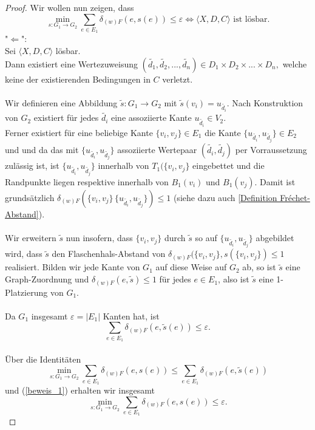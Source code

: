\documentclass[a4paper, 12pt, twoside]{article}
\theoremstyle{Format1} %
\begin{document}
\begin{proof}
Wir wollen nun zeigen, dass
$$ \min_{s: G_1 \to G_2} \sum_{e \in E_1} \delta_{(w)F}(e, s(e)) \leq \varepsilon \iff \langle X,D,C \rangle \text{ ist lösbar}.$$
"$\Leftarrow$":
\\
Sei $\langle X,D,C \rangle$ lösbar.
\\
Dann existiert eine Wertezuweisung $(\tilde{d_1},\tilde{d_2},...,\tilde{d_n}) \in {D_1 \times D_2 \times ... \times D_n},$ welche keine der existierenden Bedingungen in $C$ verletzt.
\\
\\
Wir definieren eine Abbildung $\tilde{s}:G_1 \to G_2$ mit $\tilde{s}(v_i) = u_{\tilde{d_i}}$.
Nach Konstruktion von $G_2$ existiert für jedes $\tilde{d_i}$ eine assoziierte Kante $u_{\tilde{d_i}} \in V_2$.
\\
Ferner existiert für eine beliebige Kante $\{v_i, v_j\} \in E_1$ die Kante $\{u_{\tilde{d_i}}, u_{\tilde{d_j}}\} \in E_2$ und
und da das mit $\{u_{\tilde{d_i}}, u_{\tilde{d_j}}\}$ assoziierte Wertepaar $(\tilde{d_i},\tilde{d_j})$ per Vorraussetzung zulässig ist,
ist $\{u_{\tilde{d_i}}, u_{\tilde{d_j}}\}$ innerhalb von $T_1(\{v_i, v_j\}$ eingebettet und die Randpunkte liegen respektive innerhalb von $B_1(v_i)$ und $B_1(v_j)$.
Damit ist grundsätzlich $\delta_{(w)F}(\{v_i, v_j\}\,\{u_{\tilde{d_i}}, u_{\tilde{d_j}}\}) \leq 1$ (siehe dazu auch \ref{Definition Fréchet-Abstand}).
\\
\\
Wir erweitern $\tilde{s}$ nun insofern, dass $\{v_i, v_j\}$ durch $\tilde{s}$ so auf $\{u_{\tilde{d_i}}, u_{\tilde{d_j}}\}$ abgebildet wird,
dass $\tilde{s}$ den Flaschenhals-Abstand von $\delta_{(w)F}(\{v_i, v_j\}, s(\{v_i, v_j\}) \leq 1$ realisiert.
Bilden wir jede Kante von $G_1$ auf diese Weise auf $G_2$ ab, so ist $\tilde{s}$ eine Graph-Zuordnung und $\delta_{(w)F}(e, \tilde{s}) \leq 1$ für jedes $e \in E_1$,
also ist $\tilde{s}$ eine 1-Platzierung von $G_1$.
\\
\\
Da $G_1$ insgesamt $\varepsilon = |E_1|$ Kanten hat, ist
\begin{equation} \label{beweis_1}
	\sum_{e \in E_1} \delta_{(w)F}(e, \tilde{s}(e)) \leq \varepsilon.
\end{equation}
\\
Über die Identitäten $$\min_{s: G_1 \to G_2} \sum_{e \in E_1} \delta_{(w)F}(e, s(e)) \leq \sum_{e \in E_1} \delta_{(w)F}(e,\tilde{s}(e)) $$
und (\ref{beweis_1}) erhalten wir insgesamt
$$\min_{s: G_1 \to G_2} \sum_{e \in E_1} \delta_{(w)F}(e, s(e)) \leq \varepsilon .$$

\end{proof}
\end{document}
